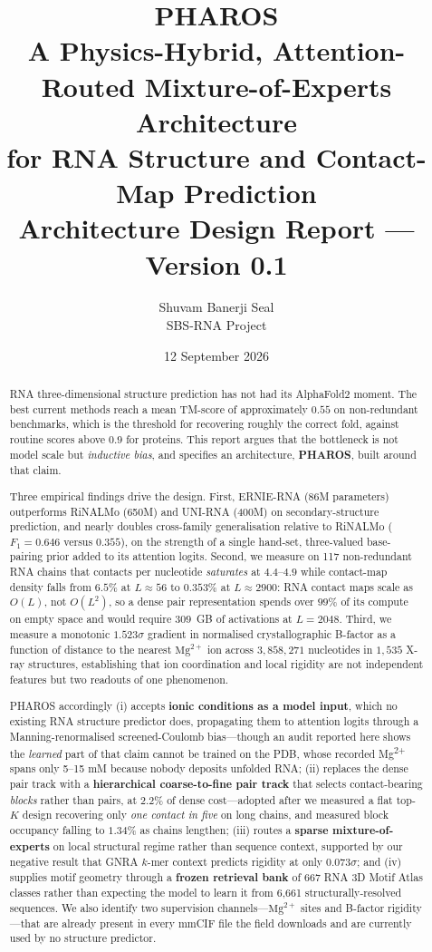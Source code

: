 \documentclass[11pt,a4paper]{article}
\title{\textbf{PHAROS}\\[0.3em]
\large A Physics-Hybrid, Attention-Routed Mixture-of-Experts Architecture\\
for RNA Structure and Contact-Map Prediction\\[0.6em]
\normalsize Architecture Design Report --- Version 0.1}
\author{Shuvam Banerji Seal\\\small SBS-RNA Project}
\date{12 September 2026}
\begin{document}
\maketitle

\begin{abstract}
\noindent
RNA three-dimensional structure prediction has not had its AlphaFold2 moment.
The best current methods reach a mean TM-score of approximately $0.55$ on
non-redundant benchmarks, which is the threshold for recovering roughly the
correct fold, against routine scores above $0.9$ for proteins. This report
argues that the bottleneck is not model scale but \emph{inductive bias}, and
specifies an architecture, \textbf{PHAROS}, built around that claim.

Three empirical findings drive the design. First, ERNIE-RNA (86M parameters)
outperforms RiNALMo (650M) and UNI-RNA (400M) on secondary-structure prediction,
and nearly doubles cross-family generalisation relative to RiNALMo ($F_1 = 0.646$
versus $0.355$), on the strength of a single hand-set, three-valued base-pairing
prior added to its attention logits. Second, we measure on 117 non-redundant RNA
chains that contacts per nucleotide \emph{saturates} at $4.4$--$4.9$ while
contact-map density falls from $6.5\%$ at $L \approx 56$ to $0.353\%$ at
$L \approx 2900$: RNA contact maps scale as $O(L)$, not $O(L^2)$, so a dense
pair representation spends over $99\%$ of its compute on empty space and would
require $309$~GB of activations at $L=2048$. Third, we measure a monotonic
$1.523\sigma$ gradient in normalised crystallographic B-factor as a function of
distance to the nearest $\mathrm{Mg}^{2+}$ ion across $3{,}858{,}271$ nucleotides
in $1{,}535$ X-ray structures,
establishing that ion coordination and local rigidity are not independent
features but two readouts of one phenomenon.

PHAROS accordingly (i) accepts \textbf{ionic conditions as a model input},
which no existing RNA structure predictor does, propagating them to attention
logits through a Manning-renormalised screened-Coulomb bias---though an audit
reported here shows the \emph{learned} part of that claim cannot be trained on
the PDB, whose recorded Mg\textsuperscript{2+} spans only 5--15 mM because
nobody deposits unfolded RNA; (ii) replaces the
dense pair track with a \textbf{hierarchical coarse-to-fine pair track} that
selects contact-bearing \emph{blocks} rather than pairs, at $2.2\%$ of dense
cost---adopted after we measured a flat top-$K$ design recovering only
\emph{one contact in five} on long chains, and measured block occupancy falling
to $1.34\%$ as chains lengthen; (iii) routes a \textbf{sparse
mixture-of-experts} on local structural regime rather than sequence context,
supported by our negative result that GNRA $k$-mer context predicts rigidity at
only $0.073\sigma$; and (iv) supplies motif geometry through a \textbf{frozen
retrieval bank} of 667 RNA 3D Motif Atlas classes rather than expecting the
model to learn it from 6{,}661 structurally-resolved sequences. We also identify
two supervision channels---$\mathrm{Mg}^{2+}$ sites and B-factor
rigidity---that are already present in every mmCIF file the field downloads and
are currently used by no structure predictor.


\end{abstract}
\end{document}
